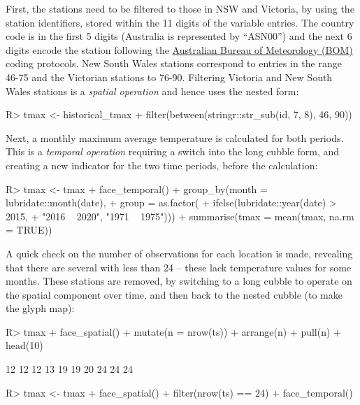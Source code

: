 \documentclass[
]{jss}
\begin{document}
First, the stations need to be filtered to those in NSW and Victoria, by using the station identifiers, stored within the 11 digits of the  variable entries. The country code is in the first 5 digits (Australia is represented by ``ASN00'') and the next 6 digits encode the station following the \href{http://www.bom.gov.au/climate/cdo/about/site-num.shtml}{Australian Bureau of Meteorology (BOM)} coding protocols. New South Wales stations correspond to entries in the range 46-75 and the Victorian stations to 76-90. Filtering Victoria and New South Wales stations is a \emph{spatial operation} and hence uses the  nested form:

\begin{CodeChunk}
\begin{CodeInput}
R> tmax <- historical_tmax %
+   filter(between(stringr::str_sub(id, 7, 8), 46, 90))
\end{CodeInput}
\end{CodeChunk}

Next, a monthly maximum average temperature is calculated for both periods. This is a \emph{temporal operation} requiring a switch into the long cubble form, and creating a new indicator for the two time periods, before the calculation:

\begin{CodeChunk}
\begin{CodeInput}
R> tmax <- tmax %
+   face_temporal() %
+   group_by(month = lubridate::month(date),
+          group = as.factor(
+            ifelse(lubridate::year(date) > 2015,
+            "2016 ~ 2020", "1971 ~ 1975"))) %
+   summarise(tmax = mean(tmax, na.rm = TRUE))
\end{CodeInput}
\end{CodeChunk}

A quick check on the number of observations for each location is made, revealing that there are several with less than 24 -- these lack temperature values for some months. These stations are removed, by switching to a long cubble to operate on the spatial component over time, and then back to the nested cubble (to make the glyph map):

\begin{CodeChunk}
\begin{CodeInput}
R> tmax %
+   face_spatial() %
+   mutate(n = nrow(ts)) %
+   arrange(n) %
+   pull(n) %
+   head(10)
\end{CodeInput}
\begin{CodeOutput}
 [1] 12 12 12 13 19 19 20 24 24 24
\end{CodeOutput}
\begin{CodeInput}
R> tmax <- tmax %
+   face_spatial() %
+   filter(nrow(ts) == 24) %
+   face_temporal()
\end{CodeInput}
\end{CodeChunk}
\end{document}

